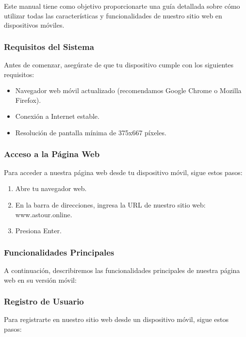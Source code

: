 Este manual tiene como objetivo proporcionarte una guía detallada sobre cómo utilizar todas las características y funcionalidades de nuestro sitio web en dispositivos móviles.

\subsubsection{Requisitos del Sistema}
Antes de comenzar, asegúrate de que tu dispositivo cumple con los siguientes requisitos:

\begin{itemize}
	\item Navegador web móvil actualizado (recomendamos Google Chrome o Mozilla Firefox).
	\item Conexión a Internet estable.
	\item Resolución de pantalla mínima de 375x667 píxeles.
\end{itemize}

\subsubsection{Acceso a la Página Web}
Para acceder a nuestra página web desde tu dispositivo móvil, sigue estos pasos:

\begin{enumerate}
	\item Abre tu navegador web.
	\item En la barra de direcciones, ingresa la URL de nuestro sitio web: www.astour.online.
	\item Presiona Enter.
\end{enumerate}

\subsubsection{Funcionalidades Principales}
A continuación, describiremos las funcionalidades principales de nuestra página web en su versión móvil:

\subsubsection{Registro de Usuario}
Para registrarte en nuestro sitio web desde un dispositivo móvil, sigue estos pasos:

